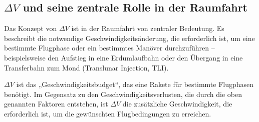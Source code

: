 %
%

\subsection{\(\Delta V\) und seine zentrale Rolle in der Raumfahrt}
Das Konzept von \(\Delta V\) ist in der Raumfahrt von zentraler Bedeutung. 
Es beschreibt die notwendige Geschwindigkeitsänderung, die erforderlich ist, um eine bestimmte Flugphase oder ein bestimmtes Manöver durchzuführen – beispielsweise den Aufstieg in eine Erdumlaufbahn oder den Übergang in eine Transferbahn zum Mond (Translunar Injection, TLI).

\(\Delta V\) ist das „Geschwindigkeitsbudget“, das eine Rakete für bestimmte Flugphasen benötigt. 
Im Gegensatz zu den Geschwindigkeitsverlusten, die durch die oben genannten Faktoren entstehen, ist \(\Delta V\) die zusätzliche Geschwindigkeit, die erforderlich ist, um die gewünschten Flugbedingungen zu erreichen.

